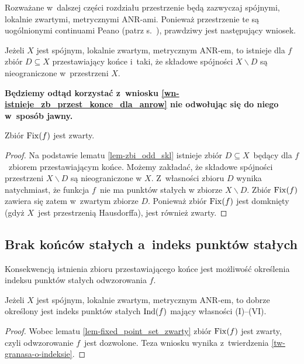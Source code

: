 Rozważane w~dalszej części rozdziału przestrzenie będą zazwyczaj spójnymi, lokalnie zwartymi, metrycznymi \mbox{ANR-ami}. Ponieważ przestrzenie te są uogólnionymi continuami Peano (patrz s.~\pageref{ANR_jest_continuum}), prawdziwy jest następujący wniosek.

\begin{wn}\label{wn-istnieje_zb_przest_konce_dla_anrow}
Jeżeli $X$ jest spójnym, lokalnie zwartym, metrycznym \mbox{ANR-em}, to istnieje dla $f$ zbiór $D\subseteq X$ przestawiający końce i~taki, że składowe spójności $X\smallsetminus D$ są nieograniczone w~przestrzeni $X$.
\end{wn}

\textbf{Będziemy odtąd korzystać z~wniosku \ref{wn-istnieje_zb_przest_konce_dla_anrow} nie odwołując się do niego w~sposób jawny.}

\begin{lem}\label{lem-fixed_point_set_zwarty}
Zbiór $\operatorname{Fix}(f)$ jest zwarty.
\end{lem}
\begin{proof}
Na podstawie lematu \ref{lem-zbi_odd_skl} istnieje zbiór $D\subseteq X$~będący dla $f$~zbiorem przestawiającym końce. Możemy zakładać, że składowe spójności przestrzeni $X\smallsetminus D$ są nieograniczone w $X$. Z~własności zbioru $D$ wynika natychmiast, że funkcja $f$~nie ma punktów stałych w zbiorze $X\smallsetminus D$. Zbiór $\operatorname{Fix}(f)$ zawiera się zatem w~zwartym zbiorze $D$. Ponieważ zbiór $\operatorname{Fix}(f)$ jest domknięty (gdyż $X$~jest przestrzenią Hausdorffa), jest również zwarty.
\end{proof}




\subsection{Brak końców stałych a~indeks punktów stałych}
Konsekwencją istnienia zbioru przestawiającego końce jest możliwość określenia indeksu punktów stałych odwzorowania $f$.

\begin{wn}
Jeżeli $X$ jest spójnym, lokalnie zwartym, metrycznym \mbox{ANR-em}, to dobrze określony jest indeks punktów stałych $\operatorname{Ind}(f)$ mający własności {\normalfont (I)}--{\normalfont (VI)}.
\end{wn}
\begin{proof}
Wobec lematu \ref{lem-fixed_point_set_zwarty} zbiór $\operatorname{Fix}(f)$ jest zwarty, czyli odwzorowanie $f$~jest dozwolone. Teza wniosku wynika z~twierdzenia \ref{tw-granasa-o-indeksie}.
\end{proof}

